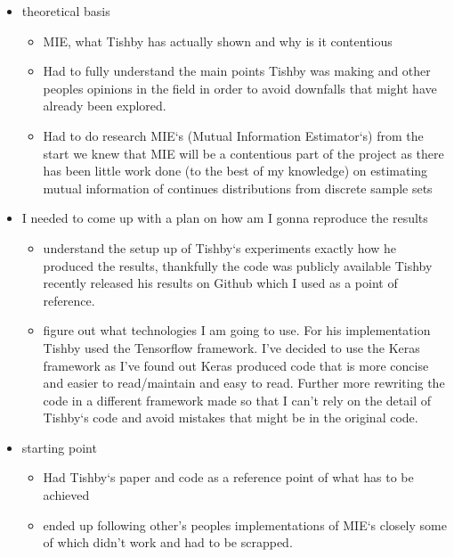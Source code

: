 \begin{itemize}
  \item{
      theoretical basis 
      \begin{itemize}
        \item{
            MIE, what Tishby has actually shown and why is it contentious
          }
        \item{
            Had to fully understand the main points Tishby was making and other
            peoples opinions in the field in order to avoid downfalls that might
            have already been explored.
          
          }
        \item{
            Had to do research MIE`s (Mutual Information Estimator`s) from the
            start we knew that MIE will be a contentious part of the project as
            there has been little work done (to the best of my knowledge) on
            estimating mutual information of continues distributions from
            discrete sample sets
          }
      \end{itemize}
    }
  \item{
      I needed to come up with a plan on how am I gonna reproduce the results
      \begin{itemize}
        \item{
            understand the setup up of Tishby`s experiments exactly how he
            produced the results, thankfully the code was publicly available
            Tishby recently released his results on Github which I used as a
            point of reference.
          }
        \item{
            figure out what technologies I am going to use. For his
            implementation Tishby used the Tensorflow framework. I've decided to
            use the Keras framework as I've found out Keras produced code that
            is more concise and easier to read/maintain and easy to read.
            Further more rewriting the code in a different framework made so
            that I can't rely on the detail of Tishby`s code and avoid mistakes
            that might be in the original code.
          }
      \end{itemize}
      
    }
  \item{
      starting point
      \begin{itemize}
        \item{
            Had Tishby`s paper and code as a reference point of what has to be
            achieved 
          }
        \item{
            ended up following other's peoples implementations of MIE`s closely
            some of which didn't work and had to be scrapped.
          }
      \end{itemize}
    }
\end{itemize}

